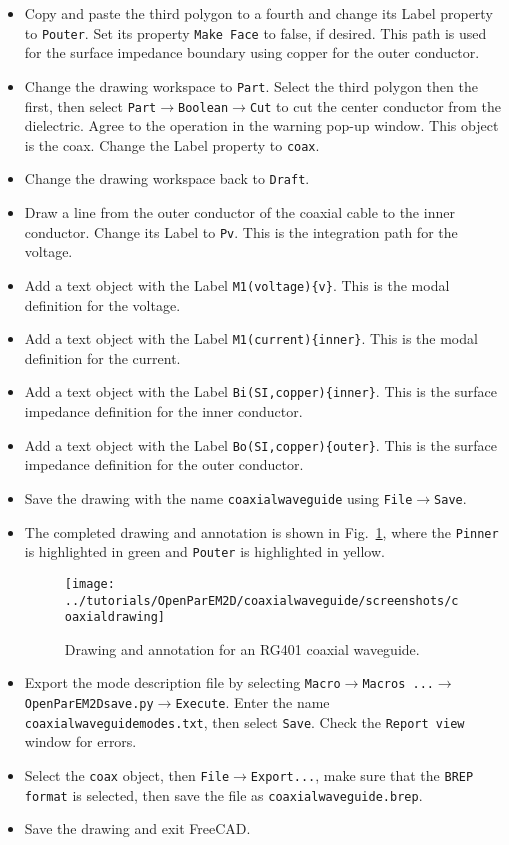 \documentclass[titlepage]{article}
\renewcommand\_{\textunderscore\linebreak[1]}
\begin{document}
\begin{itemize}
\item Copy and paste the third polygon to a fourth and change its Label property to \texttt{\_Pouter}.  Set its property \texttt{Make Face} to false, if desired.  This path is used for the surface impedance boundary using copper for the outer conductor.
\item Change the drawing workspace to \texttt{Part}.  Select the third polygon then the first, then select \newline\texttt{Part}$\rightarrow$\texttt{Boolean}$\rightarrow$\texttt{Cut} to cut the center conductor from the dielectric.  Agree to the operation in the warning pop-up window.  This object is the coax.  Change the Label property to \texttt{coax}.
\item Change the drawing workspace back to \texttt{Draft}.
\item Draw a line from the outer conductor of the coaxial cable to the inner conductor.  Change its Label to \newline\texttt{\_Pv}.  This is the integration path for the voltage.
\item Add a text object with the Label \texttt{\_M1(voltage)\{v\}}.  This is the modal definition for the voltage.
\item Add a text object with the Label \texttt{\_M1(current)\{inner\}}.  This is the modal definition for the current.
\item Add a text object with the Label \texttt{\_Bi(SI,copper)\{inner\}}.  This is the surface impedance definition for the inner conductor.
\item Add a text object with the Label \texttt{\_Bo(SI,copper)\{outer\}}.  This is the surface impedance definition for the outer conductor.
\item Save the drawing with the name \texttt{coaxial\_waveguide} using \texttt{File}$\rightarrow$\texttt{Save}.
\item The completed drawing and annotation is shown in Fig.~\ref{fig:coaxial_drawing}, where the \texttt{\_Pinner} is highlighted in green and \texttt{\_Pouter} is highlighted in yellow.
\begin{figure}
  \centering
  \texttt{[image: ../tutorials/OpenParEM2D/coaxial\_waveguide/screenshots/coaxial\_drawing]}
  \caption{Drawing and annotation for an RG401 coaxial waveguide.}
  \label{fig:coaxial_drawing}
\end{figure}
\item Export the mode description file by selecting \texttt{Macro}$\rightarrow$\texttt{Macros ...}$\rightarrow$\texttt{OpenParEM2D\_save.py}$\rightarrow$\texttt{Execute}.  Enter the name \texttt{coaxial\_waveguide\_modes.txt}, then select \texttt{Save}.  Check the \texttt{Report view} window for errors.
\item Select the \texttt{coax} object, then \texttt{File}$\rightarrow$\texttt{Export...}, make sure that the \texttt{BREP format} is selected, then save the file as \texttt{coaxial\_waveguide.brep}.
\item Save the drawing and exit FreeCAD.
\end{itemize}
\end{document}
